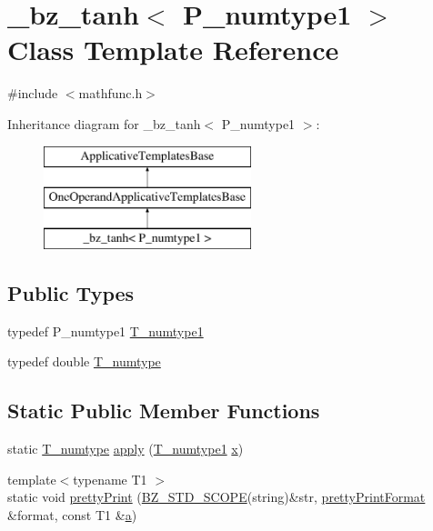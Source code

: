 \hypertarget{class__bz__tanh}{}\section{\+\_\+bz\+\_\+tanh$<$ P\+\_\+numtype1 $>$ Class Template Reference}
\label{class__bz__tanh}


{\ttfamily \#include $<$mathfunc.\+h$>$}

Inheritance diagram for \+\_\+bz\+\_\+tanh$<$ P\+\_\+numtype1 $>$\+:\begin{figure}[H]
\begin{center}
\leavevmode
\includegraphics[height=3.000000cm]{class__bz__tanh}
\end{center}
\end{figure}
\subsection*{Public Types}
\begin{DoxyCompactItemize}
\item 
typedef P\+\_\+numtype1 \hyperlink{class__bz__tanh_ac6502ddfaf1a1a3af93e05ccf18114b6}{T\+\_\+numtype1}
\item 
typedef double \hyperlink{class__bz__tanh_a37eab7aa3be2fef58b40d69a003ede33}{T\+\_\+numtype}
\end{DoxyCompactItemize}
\subsection*{Static Public Member Functions}
\begin{DoxyCompactItemize}
\item 
static \hyperlink{class__bz__tanh_a37eab7aa3be2fef58b40d69a003ede33}{T\+\_\+numtype} \hyperlink{class__bz__tanh_af85e64f9af45a476636dc7e58d57dc35}{apply} (\hyperlink{class__bz__tanh_ac6502ddfaf1a1a3af93e05ccf18114b6}{T\+\_\+numtype1} \hyperlink{vecnorm1_8cc_ac73eed9e41ec09d58f112f06c2d6cb63}{x})
\item 
{\footnotesize template$<$typename T1 $>$ }\\static void \hyperlink{class__bz__tanh_a1268f23fcfe3a5cf873b3dc5ef29af77}{pretty\+Print} (\hyperlink{numinquire_8h_a2b24ffc3b4ef9803956bc7715c6c7b83}{B\+Z\+\_\+\+S\+T\+D\+\_\+\+S\+C\+O\+P\+E}(string)\&str, \hyperlink{classprettyPrintFormat}{pretty\+Print\+Format} \&format, const T1 \&\hyperlink{gen__mat5files_8m_aae328bf20413f220e38aec4d95bfd6da}{a})
\end{DoxyCompactItemize}


